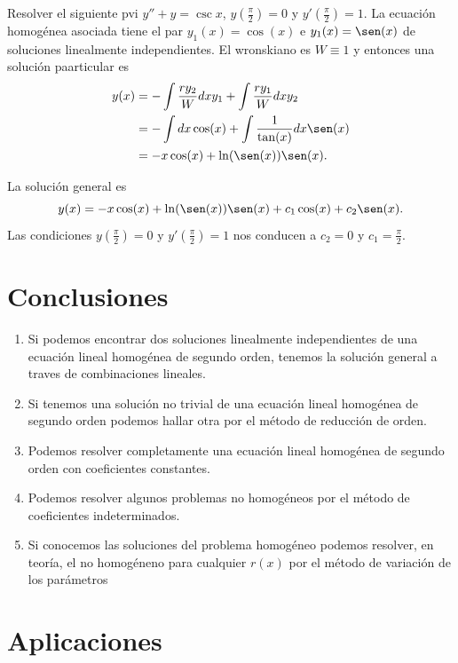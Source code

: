 \begin{ejemplo}{} Resolver el siguiente pvi $y''+y=\csc x$,
$y\left(\tfrac{\pi}{2}\right)=0$ y $y'\left(\tfrac{\pi}{2}\right)=1$.
La ecuación homogénea asociada tiene el par $y_1(x)=\cos(x)$ e $y_1(x)=\sen(x)$
   de soluciones linealmente independientes.   El wronskiano es $W\equiv 1$ y
entonces una solución paarticular es
\[\begin{split}
  y(x)&=-\int \frac{ry_2}{W}dx y_1 +\int \frac{ry_1}{W}dx y_2\\
       &=-\int dx \cos(x)+\int \frac{1}{\tan(x)}dx \sen(x)\\
       &=-x\cos(x) +\ln(\sen(x))\sen(x).
 \end{split}
\]

 La solución general es
 \[
  y(x)=-x\cos(x) +\ln(\sen(x))\sen(x)+c_1\cos(x)+c_2\sen(x).
  \]
Las condiciones $y\left(\tfrac{\pi}{2}\right)=0$ y
$y'\left(\tfrac{\pi}{2}\right)=1$ nos conducen a $c_2=0$ y $c_1=\frac{\pi}{2}$.



\end{ejemplo}
\section{Conclusiones}

\begin{enumerate}
\item Si podemos encontrar dos soluciones linealmente independientes de una ecuación lineal homogénea de segundo orden, tenemos la solución general a traves de
combinaciones lineales.
\item Si tenemos una solución no trivial de una ecuación lineal homogénea de segundo orden podemos hallar otra por el método de reducción de orden.
\item Podemos resolver completamente una ecuación lineal homogénea de segundo orden con coeficientes constantes.
\item Podemos resolver algunos problemas no homogéneos por el método de coeficientes indeterminados.
\item Si conocemos las soluciones del problema homogéneo podemos resolver, en teoría, el no homogéneno para cualquier $r(x)$ por el método de variación
de los parámetros
\end{enumerate}

\section{Aplicaciones}
